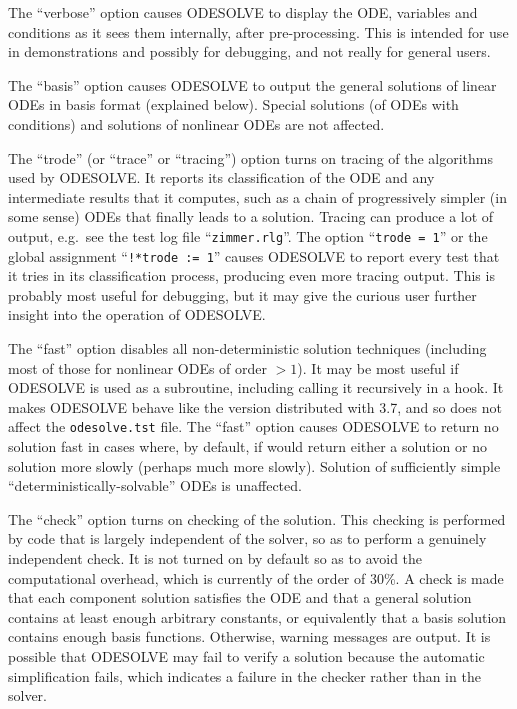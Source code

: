 The ``verbose'' option causes ODESOLVE to display the ODE, variables
and conditions as it sees them internally, after pre-processing.  This
is intended for use in demonstrations and possibly for debugging, and
not really for general users.

The ``basis'' option causes ODESOLVE to output the general solutions
of linear ODEs in basis format (explained below).  Special solutions
(of ODEs with conditions) and solutions of nonlinear ODEs are not
affected.

The ``trode'' (or ``trace'' or ``tracing'') option turns on tracing of
the algorithms used by ODESOLVE.  It reports its classification of
the ODE and any intermediate results that it computes, such as a chain
of progressively simpler (in some sense) ODEs that finally leads to a
solution.  Tracing can produce a lot of output, e.g.\ see the test log
file ``\texttt{zimmer.rlg}''.  The option ``\texttt{trode = 1}'' or
the global assignment ``\texttt{!*trode := 1}'' causes ODESOLVE to
report every test that it tries in its classification process,
producing even more tracing output.  This is probably most useful for
debugging, but it may give the curious user further insight into the
operation of ODESOLVE.

The ``fast'' option disables all non-deterministic solution techniques
(including most of those for nonlinear ODEs of order $> 1$).  It may
be most useful if ODESOLVE is used as a subroutine, including calling
it recursively in a hook.  It makes ODESOLVE behave like the version
distributed with \REDUCE{} 3.7, and so does not affect the
\texttt{odesolve.tst} file.  The ``fast'' option causes ODESOLVE to
return no solution fast in cases where, by default, if would return
either a solution or no solution more slowly (perhaps much more
slowly).  Solution of sufficiently simple
``deterministically-solvable'' ODEs is unaffected.

The ``check'' option turns on checking of the solution.  This checking
is performed by code that is largely independent of the solver, so as
to perform a genuinely independent check.  It is not turned on by
default so as to avoid the computational overhead, which is currently
of the order of 30\%.  A check is made that each component solution
satisfies the ODE and that a general solution contains at least enough
arbitrary constants, or equivalently that a basis solution contains
enough basis functions.  Otherwise, warning messages are output.  It
is possible that ODESOLVE may fail to verify a solution because the
automatic simplification fails, which indicates a failure in the
checker rather than in the solver.

